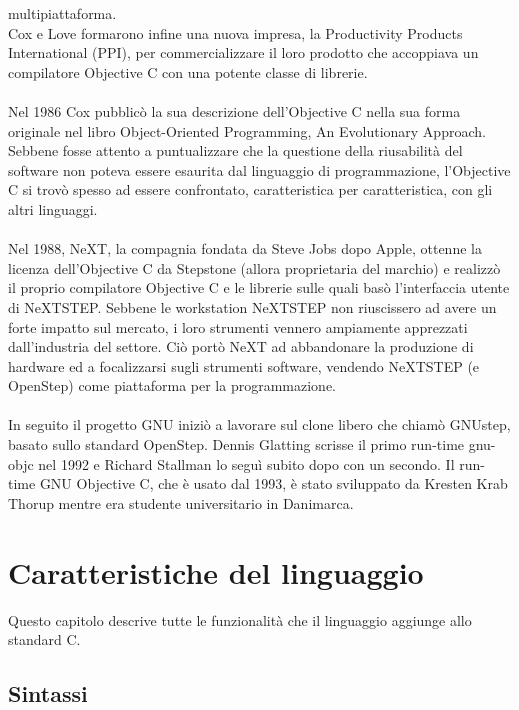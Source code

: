 multipiattaforma.\\Cox e Love formarono infine una nuova impresa, la Productivity Products International (PPI), per commercializzare il loro prodotto che accoppiava un compilatore Objective C con una potente classe di librerie.\\\\Nel 1986 Cox pubblicò la sua descrizione dell'Objective C nella sua forma originale nel libro Object-Oriented Programming, An Evolutionary Approach. Sebbene fosse attento a puntualizzare che la questione della riusabilità del software non poteva essere esaurita dal linguaggio di programmazione, l'Objective C si trovò spesso ad essere confrontato, caratteristica per caratteristica, con gli altri linguaggi.\\\\Nel 1988, NeXT, la compagnia fondata da Steve Jobs dopo Apple, ottenne la licenza dell'Objective C da Stepstone (allora proprietaria del marchio) e realizzò il proprio compilatore Objective C e le librerie sulle quali basò l'interfaccia utente di NeXTSTEP. Sebbene le workstation NeXTSTEP non riuscissero ad avere un forte impatto sul mercato, i loro strumenti vennero ampiamente apprezzati dall'industria del settore. Ciò portò NeXT ad abbandonare la produzione di hardware ed a focalizzarsi sugli strumenti software, vendendo NeXTSTEP (e OpenStep) come piattaforma per la programmazione.\\\\In seguito il progetto GNU iniziò a lavorare sul clone libero che chiamò GNUstep, basato sullo standard OpenStep. Dennis Glatting scrisse il primo run-time gnu-objc nel 1992 e Richard Stallman lo seguì subito dopo con un secondo. Il run-time GNU Objective C, che è usato dal 1993, è stato sviluppato da Kresten Krab Thorup mentre era studente universitario in Danimarca.\\
\section{Caratteristiche del linguaggio}
Questo capitolo descrive tutte le funzionalità che il linguaggio aggiunge allo standard C. 
\subsection{Sintassi}
